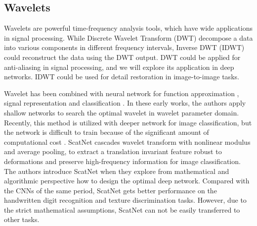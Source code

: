 \documentclass[10pt,twocolumn,letterpaper]{article}
\begin{document}
\subsection{Wavelets}
Wavelets \cite{daubechies1992ten,mallat1989theory} are powerful time-frequency analysis tools,
which have wide applications in signal processing.
While Discrete Wavelet Transform (DWT) decompose a data into various components in different frequency intervals,
Inverse DWT (IDWT) could reconstruct the data using the DWT output.
DWT could be applied for anti-aliasing in signal processing, and we will explore its application in deep networks.
IDWT could be used for detail restoration in image-to-image tasks.

Wavelet has been combined with neural network for function approximation \cite{zhang1992wavelet},
signal representation and classification \cite{szu1992neural}.
In these early works, the authors apply shallow networks to search the optimal wavelet in wavelet parameter domain.
Recently, this method is utilized with deeper network for image classification,
but the network is difficult to train because of the significant amount of computational cost \cite{de2019multi}.
ScatNet \cite{bruna2013invariant_scatnet} cascades wavelet transform with nonlinear modulus and average pooling,
to extract a translation invariant feature robust to deformations and preserve high-frequency information for image classification.
The authors introduce ScatNet when they explore from mathematical and algorithmic perspective how to design the optimal deep network.
Compared with the CNNs of the same period,
ScatNet gets better performance on the handwritten digit recognition and texture discrimination tasks.
However, due to the strict mathematical assumptions, ScatNet can not be easily transferred to other tasks.
\end{document}
